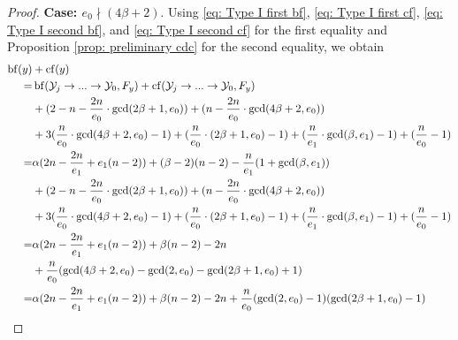 \documentclass[12pt]{amsart}
\numberwithin{equation}{section}
\theoremstyle{definition}
\newcommand{\Y}{\mathcal{Y}}
\DeclareMathOperator{\blf}{bf}
\DeclareMathOperator{\cf}{cf}
\begin{document}
\begin{proof}
    \textbf{Case: $e_0\nmid(4\beta+2)$}. Using \eqref{eq: Type I first bf}, \eqref{eq: Type I first cf}, \eqref{eq: Type I second bf}, and \eqref{eq: Type I second cf} for the first equality and Proposition \ref{prop: preliminary cdc} for the second equality, we obtain
    \begin{align*}
        \blf(y)&+\cf(y)\\=&\blf(\Y_j\to...\to\Y_0,F_y)+\cf(\Y_j\to...\to\Y_0,F_y)\\
        &+(2-n-\frac{2n}{e_0}\cdot\gcd(2\beta+1,e_0))+(n-\frac{2n}{e_0}\cdot\gcd(4\beta+2,e_0))\\
        &+3(\frac{n}{e_0}\cdot\gcd(4\beta+2,e_0)-1)+(\frac{n}{e_0}\cdot(2\beta+1,e_0)-1)+(\frac{n}{e_1}\cdot\gcd(\beta,e_1)-1)+(\frac{n}{e_0}-1)\\
        =&\alpha(2n-\frac{2n}{e_1}+e_1(n-2))+(\beta-2)(n-2)-\frac{n}{e_1}(1+\gcd(\beta,e_1))\\
        &+(2-n-\frac{2n}{e_0}\cdot\gcd(2\beta+1,e_0))+(n-\frac{2n}{e_0}\cdot\gcd(4\beta+2,e_0))\\
        &+3(\frac{n}{e_0}\cdot\gcd(4\beta+2,e_0)-1)+(\frac{n}{e_0}\cdot(2\beta+1,e_0)-1)+(\frac{n}{e_1}\cdot\gcd(\beta,e_1)-1)+(\frac{n}{e_0}-1)\\
        =&\alpha(2n-\frac{2n}{e_1}+e_1(n-2))+\beta(n-2)-2n\\
        &+\frac{n}{e_0}(\gcd(4\beta+2,e_0)-\gcd(2,e_0)-\gcd(2\beta+1,e_0)+1)\\
        =&\alpha(2n-\frac{2n}{e_1}+e_1(n-2))+\beta(n-2)-2n+\frac{n}{e_0}(\gcd(2,e_0)-1)(\gcd(2\beta+1,e_0)-1)\qedhere
    \end{align*}
\end{proof}
\end{document}
